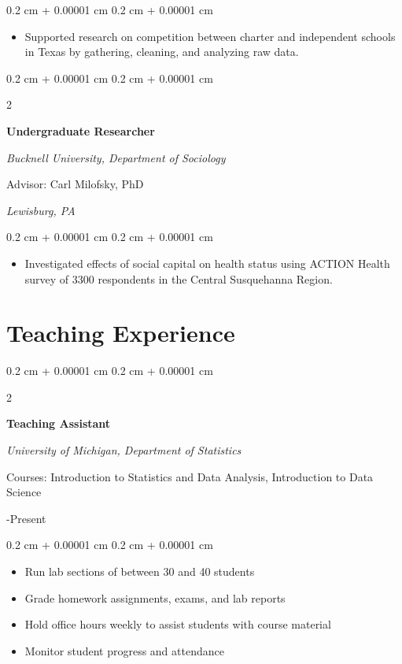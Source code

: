 \documentclass[11pt, letterpaper]{article}
\newenvironment{highlights}{
    \begin{itemize}[
        topsep=0.10 cm,
        parsep=0.10 cm,
        partopsep=0pt,
        itemsep=0pt,
        leftmargin=0.4 cm + 10pt
    ]
}{
    \end{itemize}
} %
\newenvironment{onecolentry}{
    \begin{adjustwidth}{
        0.2 cm + 0.00001 cm
    }{
        0.2 cm + 0.00001 cm
    }
}{
    \end{adjustwidth}
} %
\newenvironment{twocolentry}[2][]{
    \onecolentry
    \def\secondColumn{#2}
    \setcolumnwidth{\fill, 4.5 cm}
    \begin{paracol}{2}
}{
    \switchcolumn \raggedleft \secondColumn
    \end{paracol}
    \endonecolentry
} %
\begin{document}
\vspace{0.05 cm}
\begin{onecolentry}
    \begin{highlights}
        \item Supported research on competition between charter and independent schools in Texas by gathering, cleaning, and analyzing raw data.
    \end{highlights}
\end{onecolentry}


\pagebreak
\begin{twocolentry}{2013

        \textit{Lewisburg, PA}
    }
    \textbf{Undergraduate Researcher}

    \textit{Bucknell University, Department of Sociology}

    Advisor: Carl Milofsky, PhD
\end{twocolentry}

\vspace{0.05 cm}
\begin{onecolentry}
    \begin{highlights}
        \item  Investigated eﬀects of social capital on health status using ACTION Health
        survey of 3300 respondents in the Central Susquehanna Region.
    \end{highlights}
\end{onecolentry}

\section{Teaching Experience}

\begin{twocolentry}{2024-Present}
    \textbf{Teaching Assistant}

    \textit{University of Michigan, Department of Statistics}

    Courses: Introduction to Statistics and Data Analysis, Introduction to Data Science

\end{twocolentry}

\vspace{0.05 cm}
\begin{onecolentry}
    \begin{highlights}
        \item Run lab sections of between 30 and 40 students
        \item Grade homework assignments, exams, and lab reports
        \item Hold office hours weekly to assist students with course material
        \item Monitor student progress and attendance
    \end{highlights}
\end{onecolentry}
\end{document}
